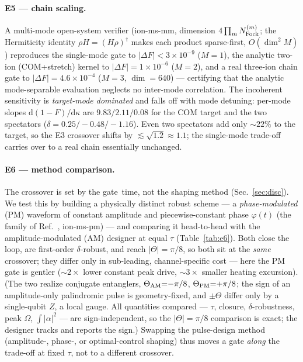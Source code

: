 \documentclass[aps,prapplied,twocolumn,superscriptaddress,floatfix,nofootinbib]{revtex4-2}
\begin{document}
\paragraph{E5 --- chain scaling.} A multi-mode open-system verifier
(\textsf{ion-ms-mm}, dimension $4\prod_m N_{\rm Fock}^{(m)}$; the Hermiticity identity
$\rho H=(H\rho)^\dagger$ makes each product sparse-first, $O(\dim^2 M)$) reproduces the
single-mode gate to $|\Delta F|<3\times10^{-9}$ ($M{=}1$), the analytic two-ion (COM+stretch)
kernel to $|\Delta F|=1\times10^{-6}$ ($M{=}2$), and a real three-ion chain gate to
$|\Delta F|=4.6\times10^{-4}$ ($M{=}3$, $\dim=640$) --- certifying that the analytic
mode-separable evaluation neglects no inter-mode correlation. The incoherent sensitivity is
\emph{target-mode dominated} and falls off with mode detuning: per-mode slopes
$\mathrm d(1{-}F)/\mathrm d\kappa$ are $9.83/2.11/0.08$ for the COM target and the two
spectators ($\delta=0.25/{-}0.48/{-}1.16$). Even two spectators add only $\sim\!22\%$ to the
target, so the E3 crossover shifts by $\lesssim\!\sqrt{1.2}\approx1.1$; the single-mode
trade-off carries over to a real chain essentially unchanged.

\paragraph{E6 --- method comparison.} The crossover is set by the gate~time,
not the shaping method (Sec.~\ref{sec:disc}). We test this by building a physically distinct
robust scheme --- a \emph{phase-modulated} (PM) waveform of constant amplitude and
piecewise-constant phase $\varphi(t)$ (the family of Ref.~\cite{Milne20}, \textsf{ion-ms-pm})
--- and comparing it head-to-head with the amplitude-modulated (AM) designer at equal $\tau$
(Table~\ref{tab:e6}). Both close the loop, are first-order $\delta$-robust, and reach
$|\Theta|=\pi/8$, so both sit at the \emph{same} crossover; they differ only in sub-leading,
channel-specific cost --- here the PM gate is gentler ($\sim\!2\times$ lower constant peak
drive, $\sim\!3\times$ smaller heating excursion). (The two realize conjugate entanglers,
$\Theta_{\rm AM}{=}{-}\pi/8$, $\Theta_{\rm PM}{=}{+}\pi/8$; the sign of an amplitude-only
palindromic pulse is geometry-fixed, and $\pm\Theta$ differ only by a single-qubit $Z$, a local
gauge. All quantities compared --- $\tau$, closure, $\delta$-robustness, peak $\Omega$,
$\int|\alpha|^2$ --- are sign-independent, so the $|\Theta|=\pi/8$ comparison is exact; the
designer tracks and reports the sign.) Swapping the pulse-design method
(amplitude-, phase-, or optimal-control shaping) thus moves a gate \emph{along} the trade-off
at fixed $\tau$, not to a different crossover.
\end{document}

